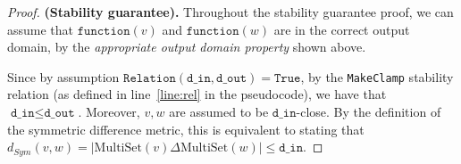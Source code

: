 \documentclass[11pt,a4paper]{article}
\newtheorem{lemma}{Lemma}
\theoremstyle{definition}
\newcommand{\MultiSet}{\mathrm{MultiSet}}
\newcommand{\din}{\texttt{d\_in}}
\newcommand{\dout}{\texttt{d\_out}}
\newcommand{\Relation}{\texttt{Relation}}
\newcommand{\X}{\mathcal{X}}
\newcommand{\Y}{\mathcal{Y}}
\newcommand{\True}{\texttt{True}}
\newcommand{\False}{\texttt{False}}
\newcommand{\function}{\texttt{function}}
\newcommand{\silvia}[1]{{ {\color{blue}{(silvia)~#1}}}}
\newcommand{\grace}[1]{{ {\color{purple}{(grace)~#1}}}}
\begin{document}
\begin{proof}



        


\smallskip
\textbf{(Stability guarantee).} Throughout the stability guarantee proof, we can assume that $\function(v)$ and $\function(w)$ are in the correct output domain, by the \textit{appropriate output domain property} shown above. 

Since by assumption $\Relation(\din, \dout) = \True$, by the \texttt{MakeClamp} stability relation (as defined in line~\ref{line:rel} in the pseudocode), we have that $\din \leq \dout$. Moreover, $v, w$ are assumed to be $\din$-close. By the definition of the symmetric difference metric, this is equivalent to stating that $d_{Sym}(v, w) = |\MultiSet(v) \Delta \MultiSet(w)| \leq \din$.


\end{proof}
\end{document}
